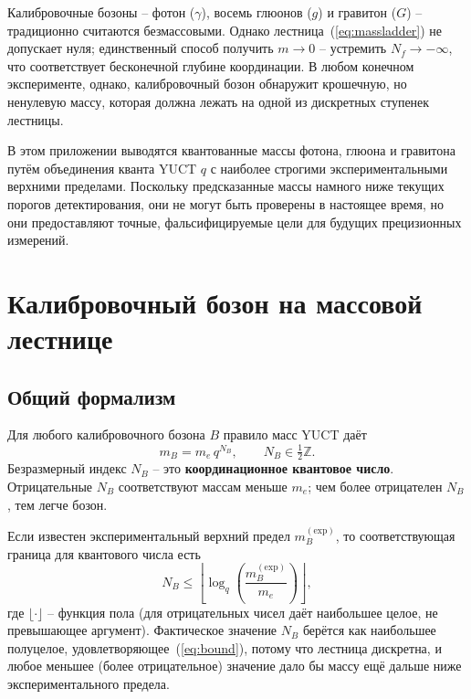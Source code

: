 \documentclass[11pt,a4paper]{article}
\begin{document}
	Калибровочные бозоны – фотон ($\gamma$), восемь глюонов ($g$) и гравитон ($G$) – традиционно считаются
	безмассовыми. Однако лестница~(\ref{eq:massladder}) не допускает нуля; единственный способ получить
	$m \to 0$ – устремить $N_f \to -\infty$, что соответствует бесконечной глубине координации.
	В любом конечном эксперименте, однако, калибровочный бозон обнаружит крошечную, но ненулевую массу,
	которая должна лежать на одной из дискретных ступенек лестницы.
	
	В этом приложении выводятся квантованные массы фотона, глюона и гравитона путём объединения
	кванта YUCT $q$ с наиболее строгими экспериментальными верхними пределами. Поскольку предсказанные
	массы намного ниже текущих порогов детектирования, они не могут быть проверены в настоящее время,
	но они предоставляют точные, фальсифицируемые цели для будущих прецизионных измерений.
	
	\section{Калибровочный бозон на массовой лестнице}
	
	\subsection{Общий формализм}
	
	Для любого калибровочного бозона $B$ правило масс YUCT даёт
	\begin{equation}\label{eq:bosonmass}
		m_B = m_e \, q^{N_B}, \qquad N_B \in \tfrac12\mathbb{Z}.
	\end{equation}
	Безразмерный индекс $N_B$ – это \textbf{координационное квантовое число}. Отрицательные $N_B$ соответствуют
	массам меньше $m_e$; чем более отрицателен $N_B$, тем легче бозон.
	
	Если известен экспериментальный верхний предел $m_B^{\mathrm{(exp)}}$, то соответствующая граница для
	квантового числа есть
	\begin{equation}\label{eq:bound}
		N_B \le \left\lfloor \log_q\!\left( \frac{m_B^{\mathrm{(exp)}}}{m_e} \right) \right\rfloor ,
	\end{equation}
	где $\lfloor\cdot\rfloor$ – функция пола (для отрицательных чисел даёт наибольшее целое, не превышающее аргумент).
	Фактическое значение $N_B$ берётся как наибольшее полуцелое, удовлетворяющее~(\ref{eq:bound}), потому что лестница
	дискретна, и любое меньшее (более отрицательное) значение дало бы массу ещё дальше ниже экспериментального предела.
	
\end{document}
